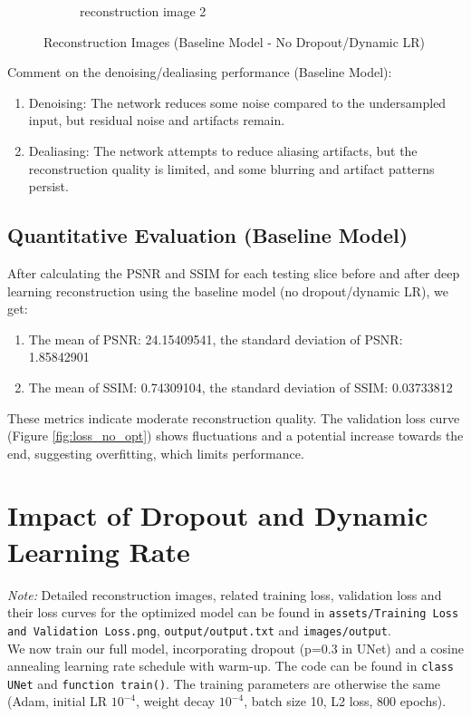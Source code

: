 \documentclass{article}
\begin{document}
\begin{figure}[ht]
\begin{subfigure}[b]{0.8\linewidth}
    \caption{reconstruction image 2}
  \end{subfigure}
  \caption{Reconstruction Images (Baseline Model - No Dropout/Dynamic LR)}
  \label{fig:reconstructed_no_opt}
\end{figure}

Comment on the denoising/dealiasing performance (Baseline Model):
\begin{enumerate}
  \item Denoising: The network reduces some noise compared to the undersampled input, but residual noise and artifacts remain.
  \item Dealiasing: The network attempts to reduce aliasing artifacts, but the reconstruction quality is limited, and some blurring and artifact patterns persist.
\end{enumerate}

\subsection{Quantitative Evaluation (Baseline Model)}
After calculating the PSNR and SSIM for each testing slice before and after deep learning reconstruction using the baseline model (no dropout/dynamic LR), we get:
\begin{enumerate}
  \item The mean of PSNR: 24.15409541, the standard deviation of PSNR: 1.85842901
  \item The mean of SSIM: 0.74309104, the standard deviation of SSIM: 0.03733812
\end{enumerate}
These metrics indicate moderate reconstruction quality. The validation loss curve (Figure \ref{fig:loss_no_opt}) shows fluctuations and a potential increase towards the end, suggesting overfitting, which limits performance.



\section{Impact of Dropout and Dynamic Learning Rate}
\textit{Note: }Detailed reconstruction images, related training loss, validation loss and their
loss curves for the optimized model can be found in \texttt{assets/Training Loss and Validation Loss.png},
\texttt{output/output.txt} and \texttt{images/output}.\\
We now train our full model, incorporating dropout (p=0.3 in UNet) and a cosine annealing learning rate schedule with warm-up. The code can be found in \texttt{class UNet} and \texttt{function train()}. The training parameters are otherwise the same (Adam, initial LR $10^{-4}$, weight decay $10^{-4}$, batch size 10, L2 loss, 800 epochs).
\end{document}
